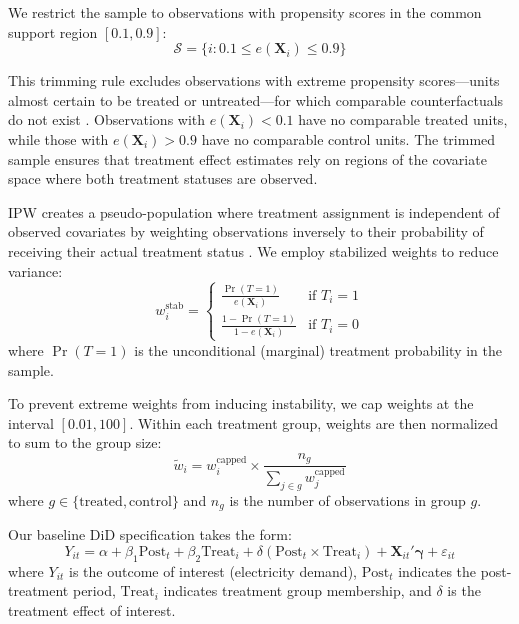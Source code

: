 \documentclass[a4paper,fleqn,longmktitle]{cas-sc}
\begin{document}
We restrict the sample to observations with propensity scores in the common support region $[0.1, 0.9]$:
\begin{equation}
    \mathcal{S} = \{i : 0.1 \leq e(\mathbf{X}_i) \leq 0.9\}
\end{equation}

This trimming rule excludes observations with extreme propensity scores---units almost certain to be treated or untreated---for which comparable counterfactuals do not exist \citep{crump2009dealing}. Observations with $e(\mathbf{X}_i) < 0.1$ have no comparable treated units, while those with $e(\mathbf{X}_i) > 0.9$ have no comparable control units. The trimmed sample ensures that treatment effect estimates rely on regions of the covariate space where both treatment statuses are observed.

IPW creates a pseudo-population where treatment assignment is independent of observed covariates by weighting observations inversely to their probability of receiving their actual treatment status \citep{hirano2003efficient}. We employ stabilized weights to reduce variance:
\begin{equation}
    w_i^{\text{stab}} = \begin{cases}
        \displaystyle\frac{\Pr(T=1)}{e(\mathbf{X}_i)} & \text{if } T_i = 1 \\[10pt]
        \displaystyle\frac{1 - \Pr(T=1)}{1 - e(\mathbf{X}_i)} & \text{if } T_i = 0
    \end{cases}
\end{equation}
where $\Pr(T=1)$ is the unconditional (marginal) treatment probability in the sample.

To prevent extreme weights from inducing instability, we cap weights at the interval $[0.01, 100]$. Within each treatment group, weights are then normalized to sum to the group size:
\begin{equation}
    \tilde{w}_i = w_i^{\text{capped}} \times \frac{n_g}{\sum_{j \in g} w_j^{\text{capped}}}
\end{equation}
where $g \in \{\text{treated}, \text{control}\}$ and $n_g$ is the number of observations in group $g$.

Our baseline DiD specification takes the form:
\begin{equation}
    Y_{it} = \alpha + \beta_1 \text{Post}_t + \beta_2 \text{Treat}_i + \delta (\text{Post}_t \times \text{Treat}_i) + \mathbf{X}_{it}'\boldsymbol{\gamma} + \varepsilon_{it}
\end{equation}
where $Y_{it}$ is the outcome of interest (electricity demand), $\text{Post}_t$ indicates the post-treatment period, $\text{Treat}_i$ indicates treatment group membership, and $\delta$ is the treatment effect of interest.
\end{document}
